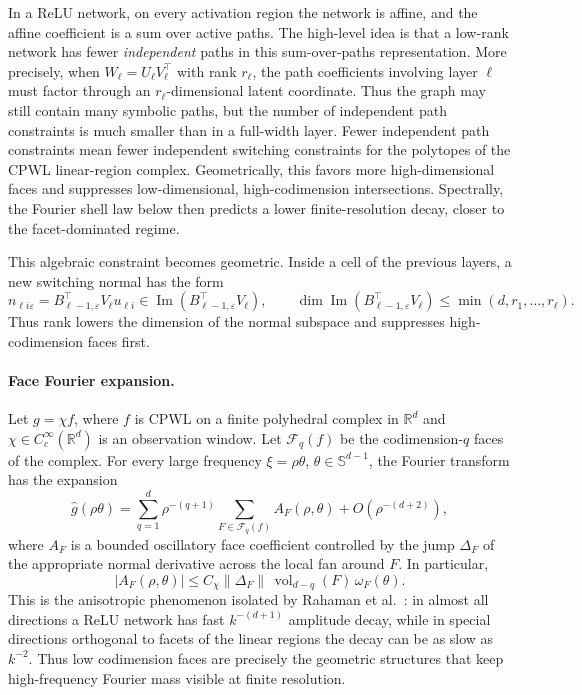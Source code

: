 \documentclass{article}
\newcommand{\R}{\mathbb{R}}
\newcommand{\wh}{\widehat}
\DeclareMathOperator{\im}{Im}
\begin{document}
In a ReLU network, on every activation region the network is affine, and the affine coefficient is a sum over active paths. The high-level idea is that a low-rank network has fewer \emph{independent} paths in this sum-over-paths representation. More precisely, when $W_\ell=U_\ell V_\ell^\top$ with rank $r_\ell$, the path coefficients involving layer $\ell$ must factor through an $r_\ell$-dimensional latent coordinate. Thus the graph may still contain many symbolic paths, but the number of independent path constraints is much smaller than in a full-width layer. Fewer independent path constraints mean fewer independent switching constraints for the polytopes of the CPWL linear-region complex. Geometrically, this favors more high-dimensional faces and suppresses low-dimensional, high-codimension intersections. Spectrally, the Fourier shell law below then predicts a lower finite-resolution decay, closer to the facet-dominated regime.

This algebraic constraint becomes geometric. Inside a cell of the previous layers, a new switching normal has the form
\begin{equation}
n_{\ell i\varepsilon}=B_{\ell-1,\varepsilon}^{\top}V_\ell u_{\ell i}
\in \im(B_{\ell-1,\varepsilon}^{\top}V_\ell),
\qquad
\dim \im(B_{\ell-1,\varepsilon}^{\top}V_\ell)\le \min(d,r_1,\ldots,r_\ell).
\end{equation}
Thus rank lowers the dimension of the normal subspace and suppresses high-codimension faces first.

\paragraph{Face Fourier expansion.}
Let $g=\chi f$, where $f$ is CPWL on a finite polyhedral complex in $\R^d$ and $\chi\in C_c^\infty(\R^d)$ is an observation window. Let $\mathcal F_q(f)$ be the codimension-$q$ faces of the complex. For every large frequency $\xi=\rho\theta$, $\theta\in\mathbb S^{d-1}$, the Fourier transform has the expansion
\begin{equation}
\wh g(\rho\theta)
=
\sum_{q=1}^d
\rho^{-(q+1)}
\sum_{F\in\mathcal F_q(f)}
A_F(\rho,\theta)
+O(\rho^{-(d+2)}),
\label{eq:face-expansion}
\end{equation}
where $A_F$ is a bounded oscillatory face coefficient controlled by the jump $\Delta_F$ of the appropriate normal derivative across the local fan around $F$. In particular,
\begin{equation}
|A_F(\rho,\theta)|
\le C_\chi \|\Delta_F\|\,\operatorname{vol}_{d-q}(F)\,\omega_F(\theta).
\end{equation}
This is the anisotropic phenomenon isolated by Rahaman et al.~\citep{rahaman2019}: in almost all directions a ReLU network has fast $k^{-(d+1)}$ amplitude decay, while in special directions orthogonal to facets of the linear regions the decay can be as slow as $k^{-2}$. Thus low codimension faces are precisely the geometric structures that keep high-frequency Fourier mass visible at finite resolution.
\end{document}
